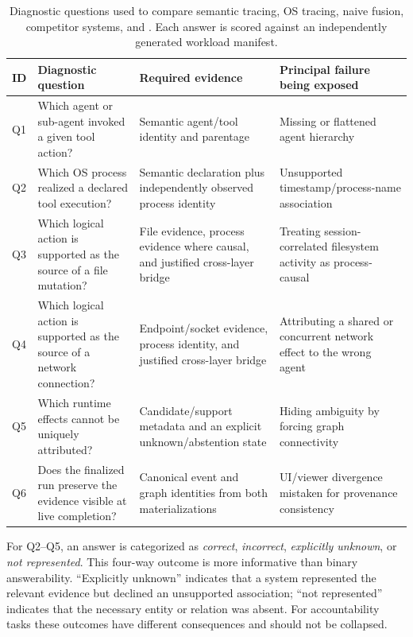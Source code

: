 \begin{table}[t]
\centering
\caption{Diagnostic questions used to compare semantic tracing, OS tracing, naive fusion, competitor systems, and \system. Each answer is scored against an independently generated workload manifest.}
\label{tab:questions}
\footnotesize
\setlength{\tabcolsep}{4.5pt}
\begin{tabular}{p{0.75cm} p{4.5cm} p{4.4cm} p{5.2cm}}
\toprule
ID & Diagnostic question & Required evidence & Principal failure being exposed \\
\midrule
Q1 & Which agent or sub-agent invoked a given tool action? & Semantic agent/tool identity and parentage & Missing or flattened agent hierarchy \\
Q2 & Which OS process realized a declared tool execution? & Semantic declaration plus independently observed process identity & Unsupported timestamp/process-name association \\
Q3 & Which logical action is supported as the source of a file mutation? & File evidence, process evidence where causal, and justified cross-layer bridge & Treating session-correlated filesystem activity as process-causal \\
Q4 & Which logical action is supported as the source of a network connection? & Endpoint/socket evidence, process identity, and justified cross-layer bridge & Attributing a shared or concurrent network effect to the wrong agent \\
Q5 & Which runtime effects cannot be uniquely attributed? & Candidate/support metadata and an explicit unknown/abstention state & Hiding ambiguity by forcing graph connectivity \\
Q6 & Does the finalized run preserve the evidence visible at live completion? & Canonical event and graph identities from both materializations & UI/viewer divergence mistaken for provenance consistency \\
\bottomrule
\end{tabular}
\end{table}

For Q2--Q5, an answer is categorized as \emph{correct}, \emph{incorrect}, \emph{explicitly unknown}, or \emph{not represented}. This four-way outcome is more informative than binary answerability. ``Explicitly unknown'' indicates that a system represented the relevant evidence but declined an unsupported association; ``not represented'' indicates that the necessary entity or relation was absent. For accountability tasks these outcomes have different consequences and should not be collapsed.

